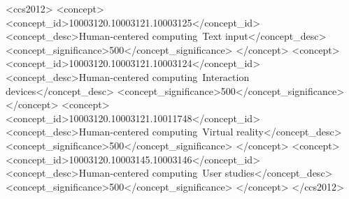 \documentclass[acmlarge]{acmart}
\begin{document}
\begin{CCSXML}
<ccs2012>
 <concept>
  <concept_id>10003120.10003121.10003125</concept_id>
  <concept_desc>Human-centered computing~Text input</concept_desc>
  <concept_significance>500</concept_significance>
 </concept>
 <concept>
  <concept_id>10003120.10003121.10003124</concept_id>
  <concept_desc>Human-centered computing~Interaction devices</concept_desc>
  <concept_significance>500</concept_significance>
 </concept>
 <concept>
  <concept_id>10003120.10003121.10011748</concept_id>
  <concept_desc>Human-centered computing~Virtual reality</concept_desc>
  <concept_significance>500</concept_significance>
 </concept>
 <concept>
  <concept_id>10003120.10003145.10003146</concept_id>
  <concept_desc>Human-centered computing~User studies</concept_desc>
  <concept_significance>500</concept_significance>
 </concept>
</ccs2012>
\end{CCSXML}





\maketitle
\end{document}
